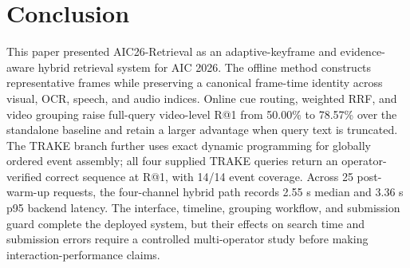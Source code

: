 \documentclass[conference]{IEEEtran}
\newcommand{\sys}{AIC26-Retrieval}
\begin{document}
\section{Conclusion}

This paper presented \sys{} as an adaptive-keyframe and evidence-aware hybrid
retrieval system for AIC 2026. The offline method constructs representative
frames while preserving a canonical frame-time identity across visual, OCR,
speech, and audio indices. Online cue routing, weighted RRF, and video grouping
raise full-query video-level R@1 from 50.00\% to 78.57\% over the standalone
baseline and retain a larger advantage when query text is truncated. The TRAKE
branch further uses exact dynamic programming for globally ordered event
assembly; all four supplied TRAKE queries return an operator-verified correct
sequence at R@1, with 14/14 event coverage. Across 25 post-warm-up requests, the
four-channel hybrid path records 2.55 s median and 3.36 s p95 backend latency.
The interface, timeline, grouping workflow, and submission guard complete the
deployed system, but their effects on search time and submission errors require
a controlled multi-operator study before making interaction-performance claims.



\end{document}
